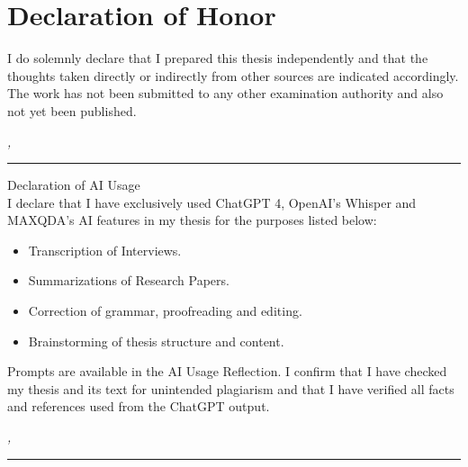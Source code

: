 %
\chapter*{Declaration of Honor}
\label{sec:declaration}
\thispagestyle{empty}

\vspace*{-10mm}

I do solemnly declare that I prepared this thesis independently and that the thoughts taken directly or indirectly from other sources are indicated accordingly.
The work has not been submitted to any other examination authority and also not
yet been published.

\bigskip

\noindent\textit{\thesisUniversityCity, \thesisDate}

\smallskip

\begin{flushright}
	\begin{minipage}{5cm}
		\rule{\textwidth}{1pt}
		\centering\thesisName
	\end{minipage}
\end{flushright}

\vspace*{20mm}

{Declaration of AI Usage} \\

I declare that I have exclusively used ChatGPT 4, OpenAI's Whisper and MAXQDA's AI features in my thesis for the purposes listed below:

\begin{itemize}
	\item Transcription of Interviews.
	\item Summarizations of Research Papers.
	\item Correction of grammar, proofreading and editing.
	\item Brainstorming of thesis structure and content.
\end{itemize}

Prompts are available in the AI Usage Reflection.
I confirm that I have checked my thesis and its text for unintended plagiarism and that I have verified all facts and references used from the ChatGPT output.

\bigskip

\noindent\textit{\thesisUniversityCity, \thesisDate}

\smallskip

\begin{flushright}
	\begin{minipage}{5cm}
		\rule{\textwidth}{1pt}
		\centering\thesisName
	\end{minipage}
\end{flushright}

